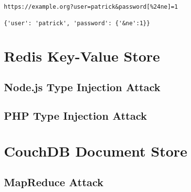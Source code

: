 \begin{lstlisting}[caption={MongoDB injection with PHP's associative arrays}, label={lst:PHPArrayInjection}]
https://example.org?user=patrick&password[%24ne]=1
\end{lstlisting}

\begin{lstlisting}[caption={Injected query parameter for MongoDB PHP injection}, label={lst:PHPArrayParam}]
{'user': 'patrick', 'password': {'&ne':1}}
\end{lstlisting}


\section{Redis Key-Value Store}
\subsection{Node.js Type Injection Attack}
\subsection{PHP Type Injection Attack}

\section{CouchDB Document Store}
\subsection{MapReduce Attack}